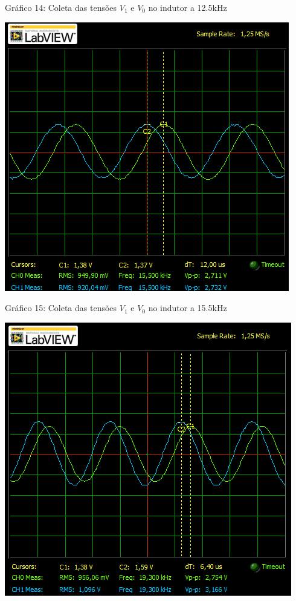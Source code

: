 \documentclass[a4 paper]{article}
\begin{document}
	\begin{center}
	Gráfico 14: Coleta das tensões $V_1$ e $V_0$ no indutor a 12.5kHz
	\end{center}

	\newpage
	\begin{table}[h]
	\centering
	\includegraphics[scale=0.7]{graficos/circ3/rgadicoa3-2-15_5}
	\end{table}
	
	\begin{center}
	Gráfico 15: Coleta das tensões $V_1$ e $V_0$ no indutor a 15.5kHz
	\end{center}

	
	\begin{table}[h]
	\centering
	\includegraphics[scale=0.7]{graficos/circ3/rgadicoa3-2-19_3}
	\end{table}
	
\end{document}

